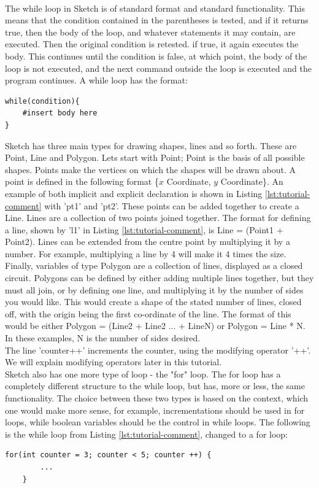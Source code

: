 \documentclass{l3proj}
\begin{document}
\\ [12pt]
The while loop in Sketch is of standard format and standard functionality. This means that the condition contained in the parentheses is tested, and if it returns true, then the body of the loop, and whatever statements it may contain, are executed. Then the original condition is retested. if true, it again executes the body. This continues until the condition is false, at which point, the body of the loop is not executed, and the next command outside the loop is executed and the program continues. A while loop has the format: 
\begin{lstlisting}[caption={The "While" Loop},label={lst:tutorial-while},xleftmargin=.35\textwidth,xrightmargin=.5\textwidth,]
while(condition){
	#insert body here
} 
\end{lstlisting}
Sketch has three main types for drawing shapes, lines and so forth. These are Point, Line and Polygon. Lets start with Point; Point is the basis of all possible shapes. Points make the vertices on which the shapes will be drawn about. A point is defined in the following format \{$x$ Coordinate, $y$ Coordinate\}. An example of both implicit and explicit declaration is shown in Listing \ref{lst:tutorial-comment} with 'pt1' and 'pt2'. These points can be added together to create a Line. Lines are a collection of two points joined together. The format for defining a line, shown by 'l1' in Listing \ref{lst:tutorial-comment}, is Line = (Point1 + Point2). Lines can be extended from the centre point by multiplying it by a number. For example, multiplying a line by 4 will make it 4 times the size. Finally, variables of type Polygon are a collection of lines, displayed as a closed circuit. Polygons can be defined by either adding multiple lines together, but they must all join, or by defining one line, and multiplying it by the number of sides you would like. This would create a shape of the stated number of lines, closed off, with the origin being the first co-ordinate of the line. The format of this would be either Polygon = (Line2 + Line2 ... + LineN) or Polygon = Line * N. In these examples, N is the number of sides desired.
\\ [12pt]
The line 'counter++' increments the counter, using the modifying operator '++'. We will explain modifying operators later in this tutorial.
\\ [12pt]
Sketch also has one more type of loop - the "for" loop. The for loop has a completely different structure to the while loop, but has, more or less, the same functionality. The choice between these two types is based on the context, which one would make more sense, for example, incrementations should be used in for loops, while boolean variables should be the control in while loops. The following is the while loop from Listing \ref{lst:tutorial-comment}, changed to a for loop:
\clearpage
\begin{lstlisting}[caption={The "For" Loop},label={lst:tutorial-for},xleftmargin=.1\textwidth,xrightmargin=.1\textwidth,]
    for(int counter = 3; counter < 5; counter ++) {
        ...
    }
\end{lstlisting}
\end{document}
